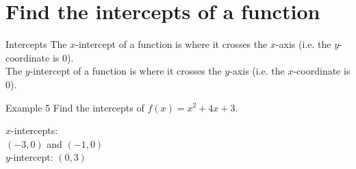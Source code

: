\documentclass[t,usenames,dvipsnames]{beamer}
\begin{document}
\section{Find the intercepts of a function}

\begin{frame}{Intercepts}
The \alert{$x$-intercept} of a function is where it crosses the $x$-axis (i.e. the $y$-coordinate is 0).    \newline\\

The \alert{$y$-intercept} of a function is where it crosses the $y$-axis (i.e. the $x$-coordinate is 0).
\end{frame}

\begin{frame}{Example 5}
Find the intercepts of $f(x) = x^2 + 4x + 3$.   \newline\\  \pause
\vspace{11pt}
\begin{minipage}{0.5\textwidth}
   \pause
\end{minipage}
\hspace{0.75cm}
\begin{minipage}{0.3\textwidth}
$x$-intercepts: \newline\\  \pause
$(-3,0)$ and $(-1,0)$ \newline\\    \pause
$y$-intercept: $(0,3)$
\end{minipage}
\end{frame}
\end{document}
